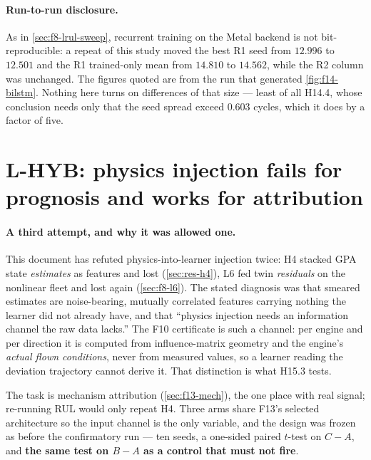 
\paragraph{Run-to-run disclosure.} As in \cref{sec:f8-lrul-sweep}, recurrent training on the
Metal backend is not bit-reproducible: a repeat of this study moved the best R1 seed from
$12.996$ to $12.501$ and the R1 trained-only mean from $14.810$ to $14.562$, while the R2
column was unchanged. The figures quoted are from the run that generated
\cref{fig:f14-bilstm}. Nothing here turns on differences of that size --- least of all H14.4,
whose conclusion needs only that the seed spread exceed $0.603$ cycles, which it does by a
factor of five.

\section{L-HYB: physics injection fails for prognosis and works for attribution}
\label{sec:f17-hybrid}

\paragraph{A third attempt, and why it was allowed one.} This document has refuted
physics-into-learner injection twice: H4 stacked GPA state \emph{estimates} as features and
lost (\cref{sec:res-h4}), L6 fed twin \emph{residuals} on the nonlinear fleet and lost again
(\cref{sec:f8-l6}). The stated diagnosis was that smeared estimates are noise-bearing,
mutually correlated features carrying nothing the learner did not already have, and that
``physics injection needs an information channel the raw data lacks.'' The F10 certificate is
such a channel: per engine and per direction it is computed from influence-matrix geometry and
the engine's \emph{actual flown conditions}, never from measured values, so a learner reading
the deviation trajectory cannot derive it. That distinction is what H15.3 tests.

The task is mechanism attribution (\cref{sec:f13-mech}), the one place with real signal;
re-running RUL would only repeat H4. Three arms share F13's selected architecture so the input
channel is the only variable, and the design was frozen as  before the
confirmatory run --- ten seeds, a one-sided paired $t$-test on $C - A$, and \textbf{the same
test on $B - A$ as a control that must not fire}.

